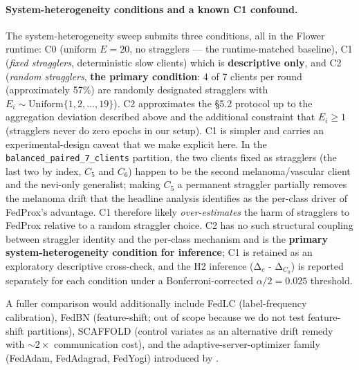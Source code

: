 \documentclass[11pt,a4paper]{article}
\begin{document}
\paragraph{System-heterogeneity conditions and a known C1 confound.}
The system-heterogeneity sweep submits three conditions, all in the
Flower runtime: C0 (uniform $E = 20$, no stragglers --- the
runtime-matched baseline), C1 (\emph{fixed stragglers}, deterministic
slow clients) which is \textbf{descriptive only}, and C2 (\emph{random
stragglers}, \textbf{the primary condition}: 4 of 7 clients per round
(approximately 57\%) are randomly designated stragglers with
$E_i \sim \mathrm{Uniform}\{1, 2, \ldots, 19\}$). C2 approximates the
\citet{li2020fedprox} §5.2 protocol up to the aggregation deviation
described above and the additional constraint that $E_i \geq 1$
(stragglers never do zero epochs in our setup). C1 is simpler and
carries an experimental-design caveat that we make explicit here. In the
\texttt{balanced\_paired\_7\_clients} partition, the two clients fixed
as stragglers (the last two by index, $C_5$ and $C_6$) happen to be
the second melanoma/vascular client and the nevi-only generalist;
making $C_5$ a permanent straggler partially removes the melanoma drift
that the headline analysis identifies as the per-class driver of
FedProx's advantage. C1 therefore likely \emph{over-estimates} the
harm of stragglers to FedProx relative to a random straggler choice.
C2 has no such structural coupling between straggler identity and the
per-class mechanism and is the \textbf{primary system-heterogeneity
condition for inference}; C1 is retained as an exploratory descriptive
cross-check, and the H2 inference (Δ$_c$ - Δ$_{C_0}$) is reported
separately for each condition under a Bonferroni-corrected
$\alpha/2 = 0.025$ threshold.

A fuller comparison would additionally include FedLC (label-frequency
calibration), FedBN \citep{li2021fedbn} (feature-shift; out of scope
because we do not test feature-shift partitions), SCAFFOLD
\citep{karimireddy2020scaffold} (control variates as an alternative
drift remedy with $\sim 2\times$ communication cost),
and the adaptive-server-optimizer family (FedAdam, FedAdagrad,
FedYogi) introduced by \citet{reddi2021adaptive}.
\end{document}
